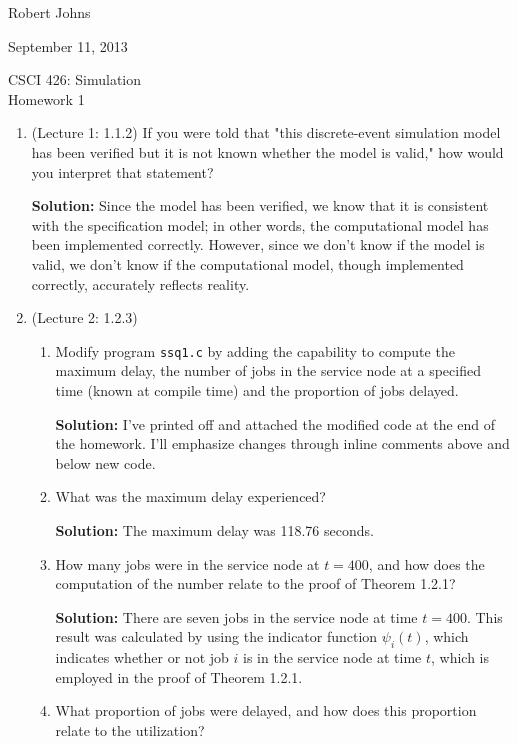\documentclass[11pt]{article} %
\begin{document}
\hfill Robert Johns

\hfill September 11, 2013

\begin{center}
{\Large CSCI 426: Simulation}\\{\large Homework 1}
\end{center}

\begin{enumerate}

\item (Lecture 1: 1.1.2) If you were told that "this discrete-event simulation model has been verified but it is not known whether the model is valid," how would you interpret that statement?

{\bf Solution:} Since the model has been verified, we know that it is consistent with the specification model; in other words, the computational model has been implemented correctly.  However, since we don't know if the model is valid, we don't know if the computational model, though implemented correctly, accurately reflects reality.

\setcounter{enumi}{1}
\item (Lecture 2: 1.2.3) \begin{enumerate}

\item Modify program \texttt{ssq1.c} by adding the capability to compute the maximum delay, the number of jobs in the service node at a specified time (known at compile time) and the proportion of jobs delayed.

{\bf Solution:} I've printed off and attached the modified code at the end of the homework.  I'll emphasize changes through inline comments above and below new code.

\item What was the maximum delay experienced?

{\bf Solution:} The maximum delay was 118.76 seconds.

\item How many jobs were in the service node at $t = 400$, and how does the computation of the number relate to the proof of Theorem 1.2.1?

{\bf Solution:} There are seven jobs in the service node at time $t=400$.  This result was calculated by using the indicator function $\psi_i(t)$, which indicates whether or not job $i$ is in the service node at time $t$, which is employed in the proof of Theorem 1.2.1.

\item What proportion of jobs were delayed, and how does this proportion relate to the utilization?


\end{enumerate}
\end{enumerate}
\end{document}
